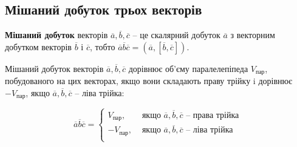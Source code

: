 \subsection{Мішаний добуток трьох векторів}

\begin{definition}
	\textbf{Мішаний добуток} векторів $\overline{a}, \overline{b}, \overline{c}$ -- це скалярний добуток $\overline{a}$
	з векторним добутком векторів $\overline{b}$ і $\overline{c}$, тобто $\overline{a}\overline{b}\overline{c} = (\overline{a}, [\overline{b}, \overline{c}])$. 
\end{definition}

\begin{theorem}
	Мішаний добуток векторів $\overline{a}, \overline{b}, \overline{c}$ дорівнює об’єму паралелепіпеда
	$V_{\text{пар}}$, побудованого на цих векторах, якщо вони складають праву трійку i дорівнює
	$-V_{\text{пар}}$, якщо $\overline{a}, \overline{b}, \overline{c}$ – ліва трійка:
	
	$$\overline{a}\overline{b}\overline{c} = \left\{\begin{array}{ll}
		V_{\text{пар}},		& \text{ якщо } \overline{a},\overline{b},\overline{c} \text{ -- права трійка}  \\
		-V_{\text{пар}},	& \text{ якщо } \overline{a},\overline{b},\overline{c} \text{ -- ліва трійка}  \\
	\end{array} \right.$$
\end{theorem}
